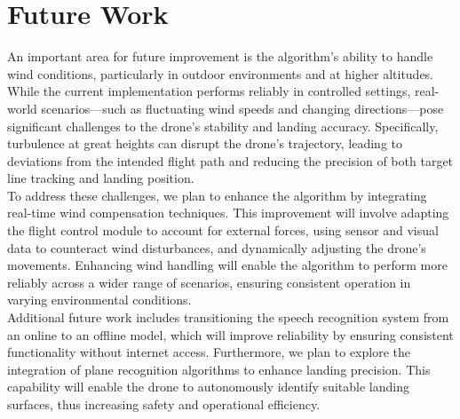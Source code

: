 \documentclass[unnumsec,webpdf,modern,large]{mam-authoring-template}%
\begin{document}
\section{Future Work} \label{sec:future}
An important area for future improvement is the algorithm's ability to handle wind conditions, particularly in outdoor environments and at higher altitudes. While the current implementation performs reliably in controlled settings, real-world scenarios—such as fluctuating wind speeds and changing directions—pose significant challenges to the drone's stability and landing accuracy. Specifically, turbulence at great heights can disrupt the drone's trajectory, leading to deviations from the intended flight path and reducing the precision of both target line tracking and landing position.\\
To address these challenges, we plan to enhance the algorithm by integrating real-time wind compensation techniques. This improvement will involve adapting the flight control module to account for external forces, using sensor and visual data to counteract wind disturbances, and dynamically adjusting the drone's movements. Enhancing wind handling will enable the algorithm to perform more reliably across a wider range of scenarios, ensuring consistent operation in varying environmental conditions.\\
Additional future work includes transitioning the speech recognition system from an online to an offline model, which will improve reliability by ensuring consistent functionality without internet access. Furthermore, we plan to explore the integration of plane recognition algorithms to enhance landing precision. This capability will enable the drone to autonomously identify suitable landing surfaces, thus increasing safety and operational efficiency.
\end{document}
